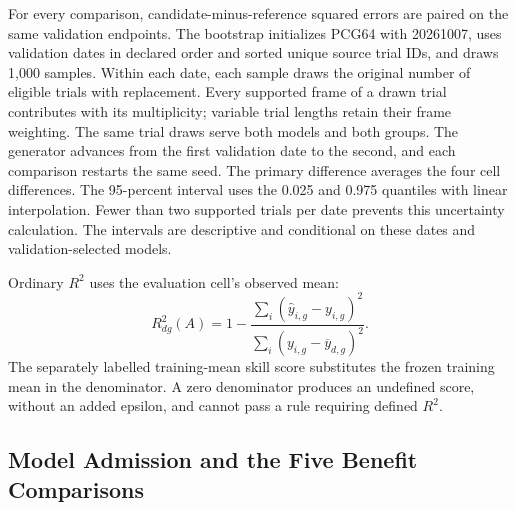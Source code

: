 For every comparison, candidate-minus-reference squared errors are paired on
the same validation endpoints. The bootstrap initializes PCG64 with 20261007,
uses validation dates in declared order and sorted unique source trial IDs,
and draws 1,000 samples. Within each date, each sample draws the original
number of eligible trials with replacement. Every supported frame of a drawn
trial contributes with its multiplicity; variable trial lengths retain their
frame weighting. The same trial draws serve both models and both groups.
The generator advances from the first validation date to the second, and each
comparison restarts the same seed. The primary difference averages the four
cell differences. The 95-percent interval uses the 0.025 and 0.975 quantiles
with linear interpolation. Fewer than two supported trials per date prevents
this uncertainty calculation. The intervals are descriptive and conditional
on these dates and validation-selected models.

Ordinary $R^2$ uses the evaluation cell's observed mean:
\[
 R^2_{dg}(A)=1-
 \frac{\sum_i(\widehat y_{i,g}-y_{i,g})^2}
 {\sum_i(y_{i,g}-\overline y_{d,g})^2}.
\]
The separately labelled training-mean skill score substitutes the frozen
training mean in the denominator. A zero denominator produces an undefined
score, without an added epsilon, and cannot pass a rule requiring defined
$R^2$.

\subsection{Model Admission and the Five Benefit Comparisons}

